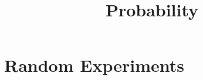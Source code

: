 \documentclass[a4paper,12pt]{article}
\title{Probability}
\date{}
\begin{document}
    \maketitle
    \part{Random Experiments}
\end{document}
